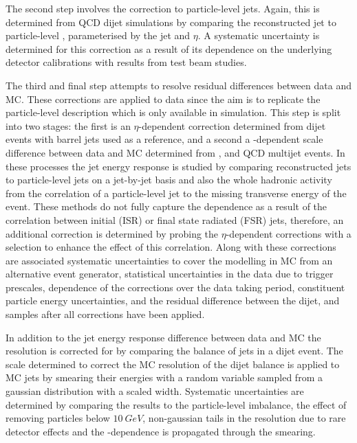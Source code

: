 The second step involves the correction to particle-level jets. Again, this is
determined from QCD dijet simulations by comparing the reconstructed jet \pt
to particle-level \pt, parameterised by the jet \pt and $\eta$. A systematic
uncertainty is determined for this correction as a result of its dependence on
the underlying detector calibrations with results from test beam studies.

The third and final step attempts to resolve residual differences between data
and MC. These corrections are applied to data since the aim is to replicate
the particle-level description which is only available in simulation. This
step is split into two stages: the first is an $\eta$-dependent correction
determined from dijet events with barrel jets used as a reference, and a
second a \pt-dependent scale difference between data and MC determined from
\IDYllj, \Igj and QCD multijet events. In these processes the jet energy
response is studied by comparing reconstructed jets to particle-level jets on
a jet-by-jet basis and also the whole hadronic activity from the correlation
of a particle-level jet to the missing transverse energy of the event. These
methods do not fully capture the dependence as a result of the correlation
between initial (ISR) or final state radiated (FSR) jets, therefore, an
additional correction is determined by probing the $\eta$-dependent
corrections with a selection to enhance the effect of this correlation. Along
with these corrections are associated systematic uncertainties to cover the
modelling in MC from an alternative event generator, statistical uncertainties
in the data due to trigger prescales, dependence of the corrections over the
data taking period, constituent particle energy uncertainties, and the
residual difference between the dijet, \Igj and \IDYllj samples after all
corrections have been applied.

In addition to the jet energy response difference between data and MC the
resolution is corrected for by comparing the balance of jets in a dijet event.
The scale determined to correct the MC resolution of the dijet balance is
applied to MC jets by smearing their energies with a random variable sampled
from a gaussian distribution with a scaled width. Systematic uncertainties
are determined by comparing the results to the particle-level imbalance, the
effect of removing particles below $\SI{10}{GeV}$, non-gaussian tails in the
resolution due to rare detector effects and the \pt-dependence is propagated
through the smearing.

